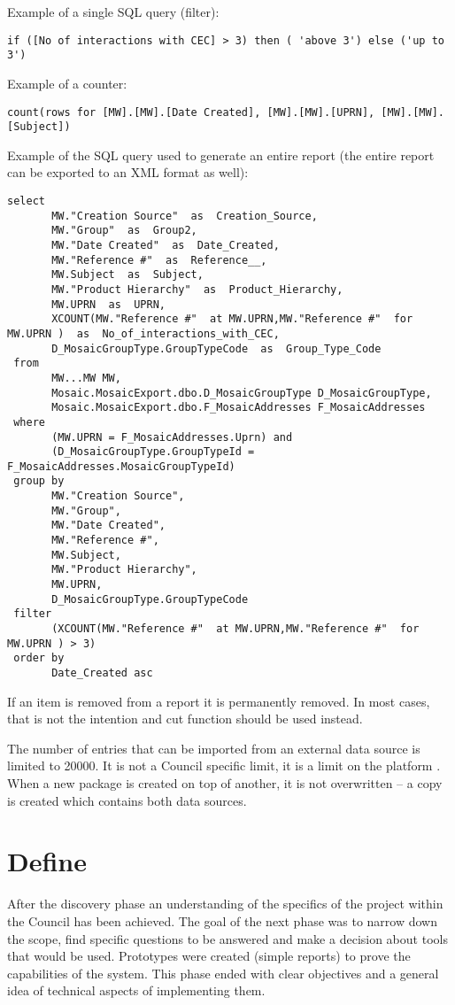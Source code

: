 Example of a single SQL query (filter):
\begin{lstlisting}
if ([No of interactions with CEC] > 3) then ( 'above 3') else ('up to 3')
\end{lstlisting}
Example of a counter:
\begin{lstlisting}
count(rows for [MW].[MW].[Date Created], [MW].[MW].[UPRN], [MW].[MW].[Subject])
\end{lstlisting}
Example of the SQL query used to generate an entire report (the entire report can be exported to an XML format as well):
\begin{lstlisting}
select 
       MW."Creation Source"  as  Creation_Source,
       MW."Group"  as  Group2,
       MW."Date Created"  as  Date_Created,
       MW."Reference #"  as  Reference__,
       MW.Subject  as  Subject,
       MW."Product Hierarchy"  as  Product_Hierarchy,
       MW.UPRN  as  UPRN,
       XCOUNT(MW."Reference #"  at MW.UPRN,MW."Reference #"  for MW.UPRN )  as  No_of_interactions_with_CEC,
       D_MosaicGroupType.GroupTypeCode  as  Group_Type_Code
 from 
       MW...MW MW,
       Mosaic.MosaicExport.dbo.D_MosaicGroupType D_MosaicGroupType,
       Mosaic.MosaicExport.dbo.F_MosaicAddresses F_MosaicAddresses
 where 
       (MW.UPRN = F_MosaicAddresses.Uprn) and 
       (D_MosaicGroupType.GroupTypeId = F_MosaicAddresses.MosaicGroupTypeId)
 group by 
       MW."Creation Source",
       MW."Group",
       MW."Date Created",
       MW."Reference #",
       MW.Subject,
       MW."Product Hierarchy",
       MW.UPRN,
       D_MosaicGroupType.GroupTypeCode
 filter 
       (XCOUNT(MW."Reference #"  at MW.UPRN,MW."Reference #"  for MW.UPRN ) > 3)
 order by 
       Date_Created asc
\end{lstlisting}

If an item is removed from a report it is permanently removed. In most cases, that is not the intention and cut function should be used instead.

The number of entries that can be imported from an external data source is limited to 20000. It is not a Council specific limit, it is a limit on the platform \citep{IBM2015d}. When a new package is created on top of another, it is not overwritten – a copy is created which contains both data sources.

	\section{Define}
	
After the discovery phase an understanding of the specifics of the project within the Council has been achieved. The goal of the next phase was to narrow down the scope, find specific questions to be answered and make a decision about tools that would be used. Prototypes were created (simple reports) to prove the capabilities of the system. This phase ended with clear objectives and a general idea of technical aspects of implementing them.	
	
